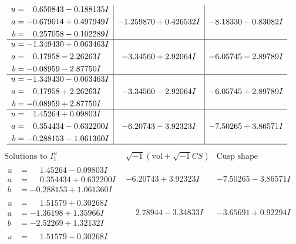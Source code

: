 \documentclass[1p]{elsarticle_modified}
\theoremstyle{definition}
\newcommand{\I}{\sqrt{-1}}
\begin{document}
$$\begin{array}{c|c|c}
\begin{aligned}
u &= \phantom{-}0.650843 - 0.188135 I \\
a &= -0.679014 + 0.497949 I \\
b &= \phantom{-}0.257058 - 0.102289 I\end{aligned}
 & -1.259870 + 0.426532 I & -8.18330 - 0.83082 I \\ \hline\begin{aligned}
u &= -1.349430 + 0.063463 I \\
a &= \phantom{-}0.17958 - 2.26263 I \\
b &= -0.08959 - 2.87750 I\end{aligned}
 & -3.34560 + 2.92064 I & -6.05745 - 2.89789 I \\ \hline\begin{aligned}
u &= -1.349430 - 0.063463 I \\
a &= \phantom{-}0.17958 + 2.26263 I \\
b &= -0.08959 + 2.87750 I\end{aligned}
 & -3.34560 - 2.92064 I & -6.05745 + 2.89789 I \\ \hline\begin{aligned}
u &= \phantom{-}1.45264 + 0.09803 I \\
a &= \phantom{-}0.354434 - 0.632200 I \\
b &= -0.288153 - 1.061360 I\end{aligned}
 & -6.20743 - 3.92323 I & -7.50265 + 3.86571 I\\
 \hline 
 \end{array}$$\newpage$$\begin{array}{c|c|c}  
\text{Solutions to }I^u_{1}& \I (\text{vol} + \sqrt{-1}CS) & \text{Cusp shape}\\
 \hline 
\begin{aligned}
u &= \phantom{-}1.45264 - 0.09803 I \\
a &= \phantom{-}0.354434 + 0.632200 I \\
b &= -0.288153 + 1.061360 I\end{aligned}
 & -6.20743 + 3.92323 I & -7.50265 - 3.86571 I \\ \hline\begin{aligned}
u &= \phantom{-}1.51579 + 0.30268 I \\
a &= -1.36198 + 1.35966 I \\
b &= -2.52269 + 1.32132 I\end{aligned}
 & \phantom{-}2.78944 - 3.34833 I & -3.65691 + 0.92294 I \\ \hline\begin{aligned}
u &= \phantom{-}1.51579 - 0.30268 I \\

\end{aligned}
\end{array}$$
\end{document}
